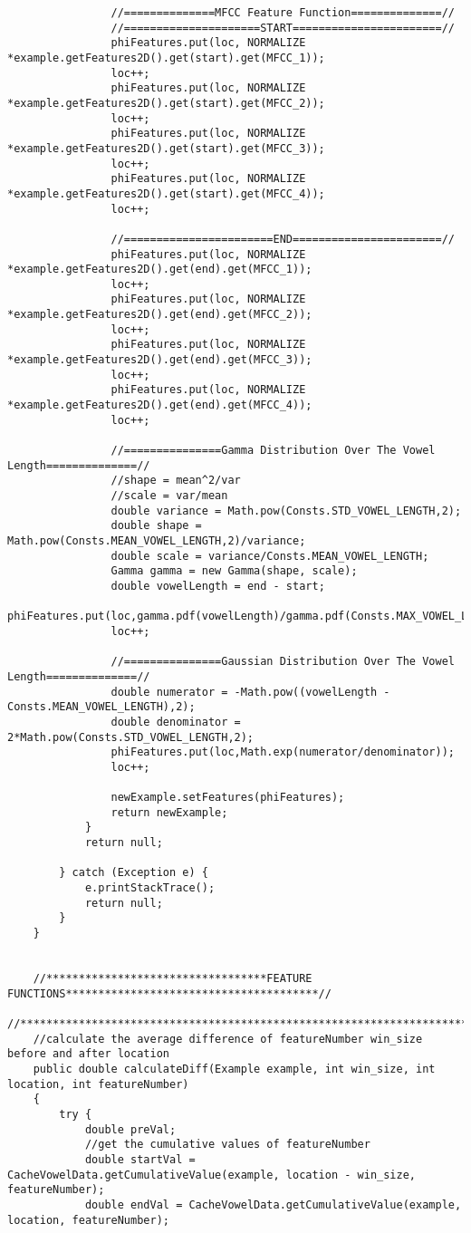 \documentclass[11pt, oneside]{article}   	%
\begin{document}
\begin{lstlisting}
                //==============MFCC Feature Function==============//
                //=====================START=======================//
                phiFeatures.put(loc, NORMALIZE *example.getFeatures2D().get(start).get(MFCC_1));
                loc++;
                phiFeatures.put(loc, NORMALIZE *example.getFeatures2D().get(start).get(MFCC_2));
                loc++;
                phiFeatures.put(loc, NORMALIZE *example.getFeatures2D().get(start).get(MFCC_3));
                loc++;
                phiFeatures.put(loc, NORMALIZE *example.getFeatures2D().get(start).get(MFCC_4));
                loc++;

                //=======================END=======================//
                phiFeatures.put(loc, NORMALIZE *example.getFeatures2D().get(end).get(MFCC_1));
                loc++;
                phiFeatures.put(loc, NORMALIZE *example.getFeatures2D().get(end).get(MFCC_2));
                loc++;
                phiFeatures.put(loc, NORMALIZE *example.getFeatures2D().get(end).get(MFCC_3));
                loc++;
                phiFeatures.put(loc, NORMALIZE *example.getFeatures2D().get(end).get(MFCC_4));
                loc++;

                //===============Gamma Distribution Over The Vowel Length==============//
                //shape = mean^2/var
                //scale = var/mean
                double variance = Math.pow(Consts.STD_VOWEL_LENGTH,2);
                double shape = Math.pow(Consts.MEAN_VOWEL_LENGTH,2)/variance;
                double scale = variance/Consts.MEAN_VOWEL_LENGTH;
                Gamma gamma = new Gamma(shape, scale);
                double vowelLength = end - start;
                phiFeatures.put(loc,gamma.pdf(vowelLength)/gamma.pdf(Consts.MAX_VOWEL_LENGTH));
                loc++;

                //===============Gaussian Distribution Over The Vowel Length==============//
                double numerator = -Math.pow((vowelLength - Consts.MEAN_VOWEL_LENGTH),2);
                double denominator = 2*Math.pow(Consts.STD_VOWEL_LENGTH,2);
                phiFeatures.put(loc,Math.exp(numerator/denominator));
                loc++;

                newExample.setFeatures(phiFeatures);
                return newExample;
            }
            return null;

        } catch (Exception e) {
            e.printStackTrace();
            return null;
        }
    }


    //**********************************FEATURE FUNCTIONS***************************************//
    //******************************************************************************************//
    //calculate the average difference of featureNumber win_size before and after location
    public double calculateDiff(Example example, int win_size, int location, int featureNumber)
    {
        try {
            double preVal;
            //get the cumulative values of featureNumber
            double startVal = CacheVowelData.getCumulativeValue(example, location - win_size, featureNumber);
            double endVal = CacheVowelData.getCumulativeValue(example, location, featureNumber);


\end{lstlisting}
\end{document}
